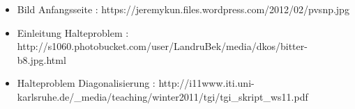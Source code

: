 \begin{frame}
	\begin{itemize}
	  \item Bild Anfangsseite :
	  https://jeremykun.files.wordpress.com/2012/02/pvsnp.jpg
	  \item Einleitung Halteproblem :
	  http://s1060.photobucket.com/user/LandruBek/media/dkos/bitter-b8.jpg.html
	  \item Halteproblem Diagonalisierung : \newline
	  http://i11www.iti.uni-karlsruhe.de/\_media/teaching/winter2011/tgi/tgi\_skript\_ws11.pdf
	\end{itemize}
\end{frame}